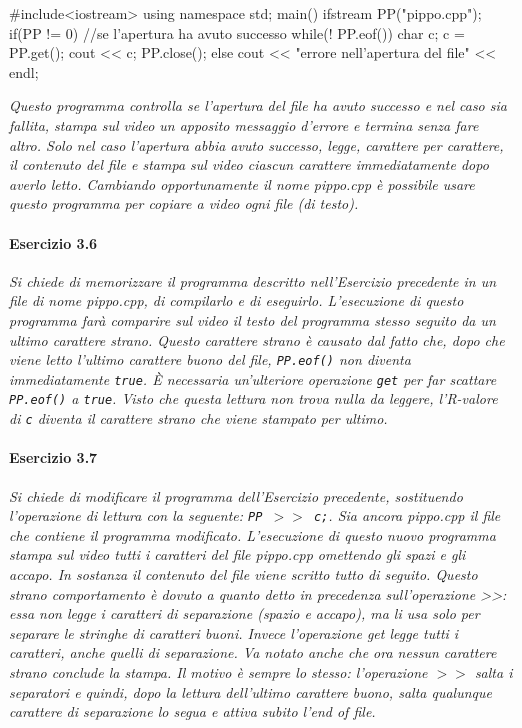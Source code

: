 \begin{codice}

#include<iostream>
using namespace std;
main() {
  ifstream PP("pippo.cpp");
  if(PP != 0) {  //se l'apertura ha avuto successo
    while(! PP.eof()) {
      char c;
      c = PP.get();
      cout << c;
    }
    PP.close();
  }
  else
    cout << "errore nell'apertura del file" << endl;
}
\end{codice}

\noindent \textit{Questo programma controlla se l'apertura del file ha avuto successo e nel caso sia fallita, stampa sul video un apposito messaggio d'errore e termina senza fare altro.
Solo nel caso l'apertura abbia avuto successo, legge, carattere per carattere, il contenuto del file e stampa sul video ciascun carattere immediatamente dopo averlo letto.
Cambiando opportunamente il nome pippo.cpp è possibile usare questo programma per copiare a video ogni file (di testo).}

\paragraph{Esercizio 3.6}
\textit{Si chiede di memorizzare il programma descritto nell'Esercizio precedente in un file di nome pippo.cpp, di compilarlo e di eseguirlo.
L'esecuzione di questo programma farà comparire sul video il testo del programma stesso seguito da un ultimo carattere strano.
Questo carattere strano è causato dal fatto che, dopo che viene letto l'ultimo carattere buono del file, \texttt{PP.eof()} non diventa immediatamente \texttt{true}.
È necessaria un'ulteriore operazione \texttt{get} per far scattare \texttt{PP.eof()} a \texttt{true}.
Visto che questa lettura non trova nulla da leggere, l'R-valore di \texttt{c} diventa il carattere strano che viene stampato per ultimo.}

\paragraph{Esercizio 3.7}
\textit{Si chiede di modificare il programma dell'Esercizio precedente, sostituendo l'operazione di lettura con la seguente: \texttt{PP $>>$ c;}.
Sia ancora pip­po.cpp il file che contiene il programma modificato.
L'esecuzione di questo nuovo programma stampa sul video tutti i caratteri del file pippo.cpp omettendo gli spazi e gli accapo.
In sostanza il contenuto del file viene scritto tutto di seguito.
Questo strano comportamento è dovuto a quanto detto in precedenza sull'operazione >>: essa non legge i caratteri di separazione (spazio e accapo), ma li usa solo per separare le stringhe di caratteri buoni.
Invece l'operazione get legge tutti i caratteri, anche quelli di separazione.
Va notato anche che ora nessun carattere strano conclude la stampa.
Il motivo è sempre lo stesso: l'operazione $>>$ salta i separatori e quindi, dopo la lettura dell'ultimo carattere buono, salta qualunque carattere di separazione lo segua e attiva subito l'end of file.}

